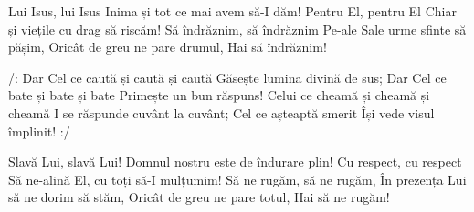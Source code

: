 \beginverse
Lui Isus, lui Isus
Inima și tot ce mai avem să-I dăm!
Pentru El, pentru El
Chiar și viețile cu drag să riscăm!
Să îndrăznim, să îndrăznim
Pe-ale Sale urme sfinte să pășim,
Oricât de greu ne pare drumul,
Hai să îndrăznim!
\endverse

\beginchorus
/: Dar Cel ce caută și caută și caută
Găsește lumina divină de sus;
Dar Cel ce bate și bate și bate
Primește un bun răspuns!
Celui ce cheamă și cheamă și cheamă
I se răspunde cuvânt la cuvânt;
Cel ce așteaptă smerit
Își vede visul împlinit! :/
\endchorus

\beginverse
Slavă Lui, slavă Lui!
Domnul nostru este de îndurare plin!
Cu respect, cu respect
Să ne-alină El, cu toți să-I mulțumim!
Să ne rugăm, să ne rugăm,
În prezența Lui să ne dorim să stăm,
Oricât de greu ne pare totul,
Hai să ne rugăm!
\endverse
\endsong